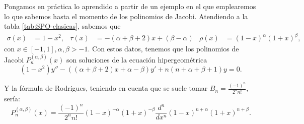 \begin{ejemplo}
    \label{ej:rodrigues-jacobi}
    Pongamos en práctica lo aprendido a partir de un ejemplo en el que emplearemos lo que sabemos hasta el momento de los polinomios de Jacobi. 
    Atendiendo a la tabla \ref{tab:SPO-clasicas}, sabemos que 
    \begin{align*}
        \sigma(x)&=1-x^2, & \tau(x) &=-(\alpha+\beta+2)x+(\beta-\alpha) & \rho(x)&=(1-x)^\alpha (1+x)^\beta,
    \end{align*}
    con $x\in[-1,1], \alpha,\beta>-1$. Con estos datos, tenemos que los polinomios de Jacobi $P_n^{(\alpha,\beta)}(x)$ son soluciones de la ecuación hipergeométrica
    $$
    (1-x^2)y''-((\alpha+\beta+2)x+ \alpha - \beta)y' + n(n+\alpha+\beta+1)y=0.
    $$
    
    Y la fórmula de Rodrigues, teniendo en cuenta que se suele tomar $B_n=\frac{(-1)^n}{2^n n!}$, sería:
    $$
    P_n^{(\alpha,\beta)}(x) = \frac{(-1)^n}{2^n n!} (1-x)^{-\alpha}(1+x)^{-\beta}\frac{d^n}{d x^n}(1-x)^{n+\alpha}(1+x)^{n+\beta}.
    $$
\end{ejemplo}

